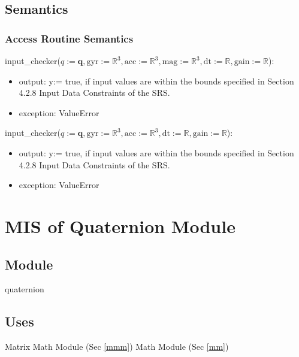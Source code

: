 \documentclass[12pt, titlepage]{article}
\begin{document}
\subsection{Semantics}


\subsubsection{Access Routine Semantics}

\noindent input\_checker($q:=\mathbf{q}, \text{gyr}:=\mathbb{R}^3, \text{acc}:=\mathbb{R}^3, \text{mag}:=\mathbb{R}^3, \text{dt}:=\mathbb{R}, \text{gain}:= \mathbb{R}$):
\begin{itemize}
\item output: y:= true, if input values are within the bounds specified in Section 4.2.8 Input Data Constraints of the SRS.
\item exception: ValueError
\end{itemize}

\noindent input\_checker($q:=\mathbf{q}, \text{gyr}:=\mathbb{R}^3, \text{acc}:=\mathbb{R}^3, \text{dt}:=\mathbb{R}, \text{gain}:= \mathbb{R}$):
\begin{itemize}
\item output: y:= true, if input values are within the bounds specified in Section 4.2.8 Input Data Constraints of the SRS.
\item exception: ValueError
\end{itemize}

\newpage

\section{MIS of Quaternion Module} \label{qm}

\subsection{Module}
quaternion

\subsection{Uses}
Matrix Math Module (Sec \ref{mmm}) \newline
Math Module (Sec \ref{mm})
\end{document}
